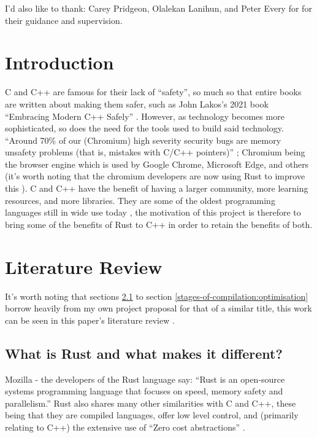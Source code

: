 \documentclass[a4paper]{article}
\begin{document}
\vspace{0.5cm}

I'd also like to thank: Carey Pridgeon, Olalekan Lanihun, and Peter Every for for their guidance and supervision.
\newpage

\listoffigures
\printglossary[type=\acronymtype, title=List of Acronyms]
\newpage

\section{Introduction}
C and C++ are famous for their lack of ``safety'', so much so that entire books are written about making them safer, such as John Lakos's 2021 book ``Embracing Modern C++ Safely'' \parencite{cpp-safety-book}. However, as technology becomes more sophisticated, so does the need for the tools used to build said technology. ``Around 70\% of our (Chromium) high severity security bugs are memory unsafety problems (that is, mistakes with C/C++ pointers)'' \parencite{chromium-bugs}; Chromium being the browser engine which is used by Google Chrome, Microsoft Edge, and others (it's worth noting that the chromium developers are now using Rust to improve this \parencite{chromium-rust}). C and C++ have the benefit of having a larger community, more learning resources, and more libraries. They are some of the oldest programming languages still in wide use today \parencite{tiobe-index}, the motivation of this project is therefore to bring some of the benefits of Rust to C++ in order to retain the benefits of both.



\section{Literature Review}
It's worth noting that sections \ref{subsection:what-is-rust} to section \ref{stages-of-compilation:optimisation} borrow heavily from my own project proposal for that of a similar title, this work can be seen in this paper's literature review \parencite{lit-review}.
\subsection{What is Rust and what makes it different?}\label{subsection:what-is-rust}
Mozilla - the developers of the Rust language say: ``Rust is an open-source systems programming language that focuses on speed, memory safety and parallelism.''  Rust also shares many other similarities with C and C++, these being that they are compiled languages, offer low level control, and (primarily relating to C++) the extensive use of ``Zero cost abstractions'' \parencite{mozilla-rust}.
\end{document}
